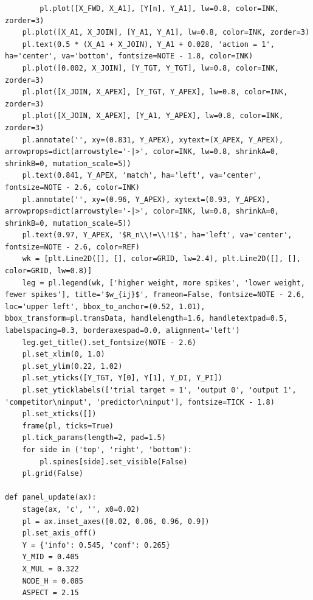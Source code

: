 \documentclass[a4paper,10pt]{article}
\begin{document}
\begin{Verbatim}
        pl.plot([X_FWD, X_A1], [Y[n], Y_A1], lw=0.8, color=INK, zorder=3)
    pl.plot([X_A1, X_JOIN], [Y_A1, Y_A1], lw=0.8, color=INK, zorder=3)
    pl.text(0.5 * (X_A1 + X_JOIN), Y_A1 + 0.028, 'action = 1', ha='center', va='bottom', fontsize=NOTE - 1.8, color=INK)
    pl.plot([0.002, X_JOIN], [Y_TGT, Y_TGT], lw=0.8, color=INK, zorder=3)
    pl.plot([X_JOIN, X_APEX], [Y_TGT, Y_APEX], lw=0.8, color=INK, zorder=3)
    pl.plot([X_JOIN, X_APEX], [Y_A1, Y_APEX], lw=0.8, color=INK, zorder=3)
    pl.annotate('', xy=(0.831, Y_APEX), xytext=(X_APEX, Y_APEX), arrowprops=dict(arrowstyle='-|>', color=INK, lw=0.8, shrinkA=0, shrinkB=0, mutation_scale=5))
    pl.text(0.841, Y_APEX, 'match', ha='left', va='center', fontsize=NOTE - 2.6, color=INK)
    pl.annotate('', xy=(0.96, Y_APEX), xytext=(0.93, Y_APEX), arrowprops=dict(arrowstyle='-|>', color=INK, lw=0.8, shrinkA=0, shrinkB=0, mutation_scale=5))
    pl.text(0.97, Y_APEX, '$R_n\\!=\\!1$', ha='left', va='center', fontsize=NOTE - 2.6, color=REF)
    wk = [plt.Line2D([], [], color=GRID, lw=2.4), plt.Line2D([], [], color=GRID, lw=0.8)]
    leg = pl.legend(wk, ['higher weight, more spikes', 'lower weight, fewer spikes'], title='$w_{ij}$', frameon=False, fontsize=NOTE - 2.6, loc='upper left', bbox_to_anchor=(0.52, 1.01), bbox_transform=pl.transData, handlelength=1.6, handletextpad=0.5, labelspacing=0.3, borderaxespad=0.0, alignment='left')
    leg.get_title().set_fontsize(NOTE - 2.6)
    pl.set_xlim(0, 1.0)
    pl.set_ylim(0.22, 1.02)
    pl.set_yticks([Y_TGT, Y[0], Y[1], Y_DI, Y_PI])
    pl.set_yticklabels(['trial target = 1', 'output 0', 'output 1', 'competitor\ninput', 'predictor\ninput'], fontsize=TICK - 1.8)
    pl.set_xticks([])
    frame(pl, ticks=True)
    pl.tick_params(length=2, pad=1.5)
    for side in ('top', 'right', 'bottom'):
        pl.spines[side].set_visible(False)
    pl.grid(False)

def panel_update(ax):
    stage(ax, 'c', '', x0=0.02)
    pl = ax.inset_axes([0.02, 0.06, 0.96, 0.9])
    pl.set_axis_off()
    Y = {'info': 0.545, 'conf': 0.265}
    Y_MID = 0.405
    X_MUL = 0.322
    NODE_H = 0.085
    ASPECT = 2.15


\end{Verbatim}
\end{document}
